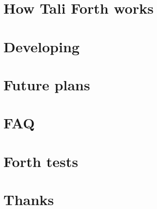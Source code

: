 \documentclass[a4paper,notitlepage]{report}
\begin{document}
\chapter{How Tali Forth works}
        

\chapter{Developing}
        

\chapter{Future plans}


\appendix

\chapter{FAQ}
        

\chapter{Forth tests}
        

\chapter{Thanks}
        

\begin{theindex}
\end{theindex}
\end{document}
